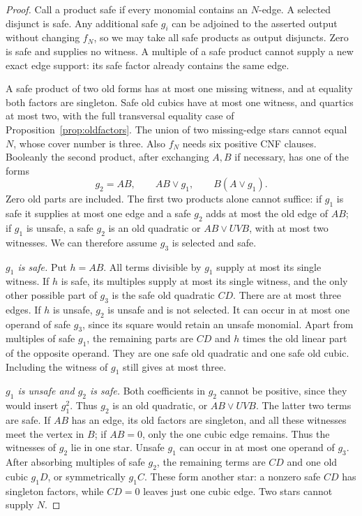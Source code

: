 \documentclass[11pt]{article}
\theoremstyle{definition}
\theoremstyle{remark}
\begin{document}
\begin{proof}
Call a product safe if every monomial contains an $N$-edge. A selected disjunct is safe. Any additional safe $g_i$ can be adjoined to the asserted output without changing $f_N$, so we may take all safe products as output disjuncts. Zero is safe and supplies no witness. A multiple of a safe product cannot supply a new exact edge support: its safe factor already contains the same edge.

A safe product of two old forms has at most one missing witness, and at equality both factors are singleton. Safe old cubics have at most one witness, and quartics at most two, with the full transversal equality case of Proposition~\ref{prop:oldfactors}. The union of two missing-edge stars cannot equal $N$, whose cover number is three. Also $f_N$ needs six positive CNF clauses. Booleanly the second product, after exchanging $A,B$ if necessary, has one of the forms
\[
 g_2=AB,\qquad AB\vee g_1,\qquad B(A\vee g_1).
\]
Zero old parts are included. The first two products alone cannot suffice: if $g_1$ is safe it supplies at most one edge and a safe $g_2$ adds at most the old edge of $AB$; if $g_1$ is unsafe, a safe $g_2$ is an old quadratic or $AB\vee UVB$, with at most two witnesses. We can therefore assume $g_3$ is selected and safe.

\emph{$g_1$ is safe.} Put $h=AB$. All terms divisible by $g_1$ supply at most its single witness. If $h$ is safe, its multiples supply at most its single witness, and the only other possible part of $g_3$ is the safe old quadratic $CD$. There are at most three edges. If $h$ is unsafe, $g_2$ is unsafe and is not selected. It can occur in at most one operand of safe $g_3$, since its square would retain an unsafe monomial. Apart from multiples of safe $g_1$, the remaining parts are $CD$ and $h$ times the old linear part of the opposite operand. They are one safe old quadratic and one safe old cubic. Including the witness of $g_1$ still gives at most three.

\emph{$g_1$ is unsafe and $g_2$ is safe.} Both coefficients in $g_2$ cannot be positive, since they would insert $g_1^2$. Thus $g_2$ is an old quadratic, or $AB\vee UVB$. The latter two terms are safe. If $AB$ has an edge, its old factors are singleton, and all these witnesses meet the vertex in $B$; if $AB=0$, only the one cubic edge remains. Thus the witnesses of $g_2$ lie in one star. Unsafe $g_1$ can occur in at most one operand of $g_3$. After absorbing multiples of safe $g_2$, the remaining terms are $CD$ and one old cubic $g_1D$, or symmetrically $g_1C$. These form another star: a nonzero safe $CD$ has singleton factors, while $CD=0$ leaves just one cubic edge. Two stars cannot supply $N$.


\end{proof}
\end{document}
